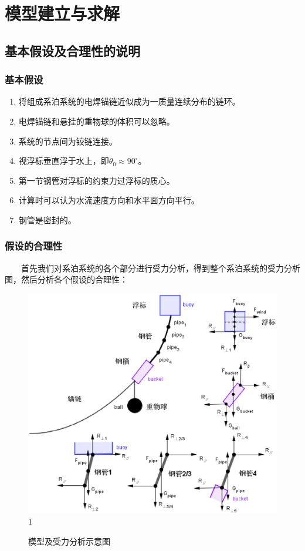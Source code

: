\documentclass[a4paper,12pt]{ctexart}
\begin{document}

\section{模型建立与求解}

\subsection{基本假设及合理性的说明}
\subsubsection{基本假设}
\begin{enumerate}
\item 将组成系泊系统的电焊锚链近似成为一质量连续分布的链环。
\item 电焊锚链和悬挂的重物球的体积可以忽略。
\item 系统的节点间为铰链连接。
\item 视浮标垂直浮于水上，即$\theta_0\approx90^{\circ}$。
\item 第一节钢管对浮标的约束力过浮标的质心。
\item 计算时可以认为水流速度方向和水平面方向平行。
\item 钢管是密封的。
\end{enumerate}
\subsubsection{假设的合理性}

~~~~首先我们对系泊系统的各个部分进行受力分析，得到整个系泊系统的受力分析图，然后分析各个假设的合理性：

\begin{figure}[H]
\centering
\includegraphics[width=400pt]{final.eps}1
\caption{模型及受力分析示意图}
\end{figure}
\end{document}
